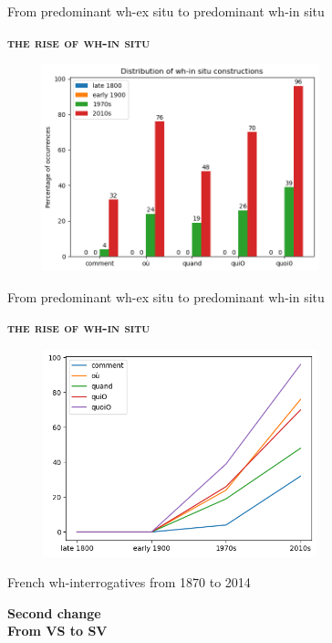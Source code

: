 \documentclass[lesson_slides]{subfiles}
\begin{document}
\begin{frame}[c]{From predominant wh-ex situ to predominant wh-in situ}

    \textbf{\textsc{the rise of wh-in situ}} \pause
    \begin{center}
        \includegraphics[width=10cm, height=6cm]{images/insitucolumns.png}
    \end{center}
  
\end{frame}
\begin{frame}[c]{From predominant wh-ex situ to predominant wh-in situ}

    \textbf{\textsc{the rise of wh-in situ}} \pause
    \begin{center}
        \includegraphics[width=10cm, height=6cm]{images/insitu.png}
    \end{center}
  
\end{frame}
\begin{frame}[c]{French wh-interrogatives from 1870 to 2014}
    
\begin{center}
    \textbf{Second change\\From VS to SV}
\end{center}
  
\end{frame}
\end{document}

